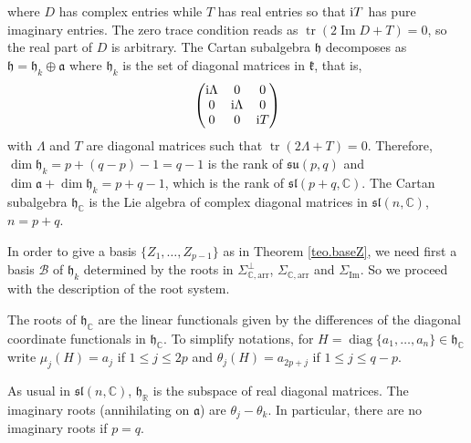 \documentclass[pdftex]{sigma}
\numberwithin{equation}{section}
\newcommand{\func}[1]{\operatorname{#1}}
\begin{document}
where $D$ has complex entries while $T$ has real entries so that ${\rm i}T$ has pure imaginary entries. The zero trace condition reads as $\operatorname{tr} ( 2\func{Im}D+T ) =0$, so the real part of $D$ is arbitrary. The Cartan subalgebra $\mathfrak{h}$ decomposes as $\mathfrak{h}=\mathfrak{h}_{k}\oplus \mathfrak{a}$ where $\mathfrak{h}_{k}$ is the set of diagonal matrices in $\mathfrak{k}$, that is,
\begin{gather*}
\left(
\begin{matrix}
{\rm i}\Lambda & 0 & 0 \\
0 & {\rm i}\Lambda & 0 \\
0 & 0 & {\rm i}T
\end{matrix}
\right)
\end{gather*}
with $\Lambda $ and $T$ are diagonal matrices such that $\operatorname{tr}(2\Lambda +T)=0$. Therefore, $\dim \mathfrak{h}_{k}=p+(q-p) -1=q-1$ is the rank of $\mathfrak{su}(p,q) $ and $\dim \mathfrak{a}+\dim
\mathfrak{h}_{k}=p+q-1$, which is the rank of $\mathfrak{sl} ( p+q,\mathbb{C} ) $. The Cartan subalgebra $\mathfrak{h}_{\mathbb{C}}$ is the Lie algebra of complex diagonal matrices in $\mathfrak{sl} ( n,\mathbb{C} ) $, $n=p+q$.

In order to give a basis $\{Z_1, \ldots,Z_{p-1}\}$ as in Theorem \ref{teo.baseZ}, we need first a basis $\mathcal{B}$ of $\mathfrak{h }_k$ determined by the roots in $\Sigma_{\mathbb{C},\mathrm{arr}}^\bot$, $\Sigma_{\mathbb{C},\mathrm{arr}}$ and $\Sigma_{\mathrm{Im}}$. So we proceed with the description of the root system.

The roots of $\mathfrak{h}_{\mathbb{C}}$ are the linear functionals given by the differences of the diagonal coordinate functionals in $\mathfrak{h}_{\mathbb{C}}$. To simplify notations, for $H=\operatorname{diag}\{a_{1},\ldots,a_{n}\}\in \mathfrak{h }_\mathbb{C}$ write $\mu _{j}(H) =a_{j}$ if $1\leq j\leq 2p$ and $\theta _{j}(H) =a_{2p+j}$ if $1\leq j\leq q-p$.

As usual in $\mathfrak{sl}( n,\mathbb{C}) $, $\mathfrak{h}_{\mathbb{R}}$ is the subspace of real diagonal matrices. The imaginary roots (annihilating on $\mathfrak{a}$) are $\theta _{j}-\theta _{k}$. In particular, there are no imaginary roots if $p=q$.
\end{document}

